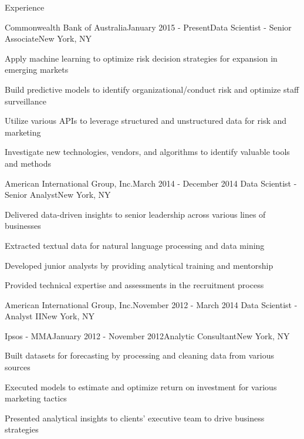 \documentclass{resume} %
\begin{document}
\vspace{-0.2cm}
\begin{rSection}{Experience}

\begin{rSubsection}{Commonwealth Bank of Australia}{January 2015 - Present}{Data Scientist - Senior Associate}{New York, NY}
\item Apply machine learning to optimize risk decision strategies for expansion in emerging markets
\item Build predictive models to identify organizational/conduct risk and optimize staff surveillance
\item Utilize various APIs to leverage structured and unstructured data for risk and marketing
\item Investigate new technologies, vendors, and algorithms to identify valuable tools and methods
\end{rSubsection}

\vspace{-0.2cm}
\begin{rSubsection}{American International Group, Inc.}{March 2014 - December 2014}
{Data Scientist - Senior Analyst}{New York, NY}
\item Delivered data-driven insights to senior leadership across various lines of businesses
\item Extracted textual data for natural language processing and data mining
\item Developed junior analysts by providing analytical training and mentorship
\item Provided technical expertise and assessments in the recruitment process
\end{rSubsection}

\vspace{-0.2cm}
\begin{rSubsection}{American International Group, Inc.}{November 2012 - March 2014}
{Data Scientist - Analyst II}{New York, NY}
\end{rSubsection}

\vspace{-0.2cm}
\begin{rSubsection}{Ipsos - MMA}{January 2012 - November 2012}{Analytic Consultant}{New York, NY}
\item Built datasets for forecasting by processing and cleaning data from various sources
\item Executed models to estimate and optimize return on investment for various marketing tactics
\item Presented analytical insights to clients' executive team to drive business strategies
\end{rSubsection}

\end{rSection}
\end{document}
